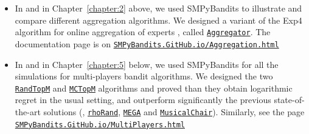 \begin{itemize}
    \item
In \cite{Besson2018WCNC} and in Chapter~\ref{chapter:2} above, we used SMPyBandits to illustrate and compare different aggregation algorithms. We designed a variant of the Exp4 algorithm for online aggregation of experts \cite{Bubeck12}, called \texttt{\href{https://SMPyBandits.GitHub.io/docs/Policies.Aggregator.html}{Aggregator}}.
The documentation page is on \texttt{\href{https://SMPyBandits.GitHub.io/Aggregation.html}{SMPyBandits.GitHub.io/Aggregation.html}}

    \item
In \cite{Besson2018ALT} and in Chapter~\ref{chapter:5} below, we used SMPyBandits for all the simulations for multi-players bandit algorithms. We designed the two \texttt{\href{https://SMPyBandits.GitHub.io/docs/PoliciesMultiPlayers.RandTopM.html}{RandTopM}} and \texttt{\href{https://SMPyBandits.GitHub.io/docs/PoliciesMultiPlayers.MCTopM.html}{MCTopM}} algorithms and proved than they obtain logarithmic regret in the usual setting, and outperform significantly the previous state-of-the-art solutions (\ie, \texttt{\href{https://SMPyBandits.GitHub.io/docs/PoliciesMultiPlayers.rhoRand.html}{rhoRand}}, \texttt{\href{https://SMPyBandits.GitHub.io/docs/Policies.MEGA.html}{MEGA}} and \texttt{\href{https://SMPyBandits.GitHub.io/docs/Policies.MusicalChair.html}{MusicalChair}}).
Similarly, see the page \texttt{\href{https://SMPyBandits.GitHub.io/MultiPlayers.html}{SMPyBandits.GitHub.io/MultiPlayers.html}}


\end{itemize}
